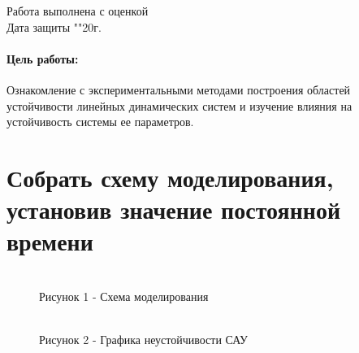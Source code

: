 \documentclass[a4paper, 11pt]{article}
\begin{document}
\begin{titlepage}
		Работа выполнена с оценкой \hspace{1cm} \underline{\hspace{8cm}} \\ 
		\vspace{1cm}
		Дата защиты "\underline{\hspace{0.7cm}}"\hspace{0.2cm}\underline{\hspace{2cm}}\hspace{0.2cm}20\underline{\hspace{0.7cm}}г.

	\end{titlepage}


\paragraph{Цель работы: }Ознакомление с экспериментальными методами построения областей устойчивости линейных динамических систем и изучение влияния на устойчивость системы ее параметров.

\section{Собрать схему моделирования, установив значение постоянной времени}


\begin{figure}[h]
	
	\\
	\centering Рисунок 1 - Схема моделирования
	
\end{figure}

\begin{figure}[h]

	\\
		\centering Рисунок 2 - Графика неустойчивости САУ
\end{figure}
\end{document}
